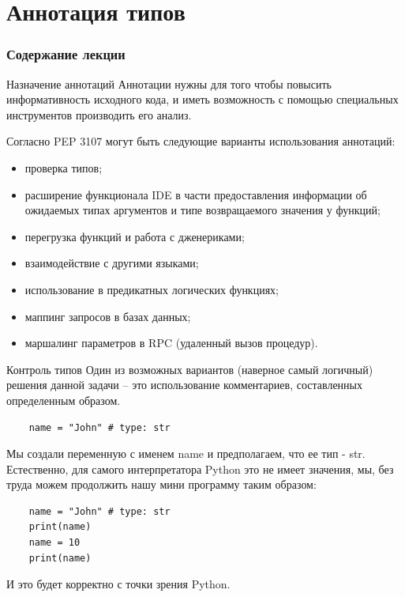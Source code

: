 \documentclass[xcolor=table]{beamer}
\begin{document}
\section{Аннотация типов}

\begin{frame}
  \frametitle{Содержание лекции}
  \tableofcontents[current]
\end{frame}

\begin{frame}[fragile]{Назначение аннотаций}
	Аннотации нужны для того чтобы повысить информативность исходного кода, и иметь возможность с помощью специальных инструментов производить его анализ. 

	\medskip
		
	Согласно PEP 3107 могут быть следующие варианты использования аннотаций:
	\begin{itemize}
		\item проверка типов;
		\item расширение функционала IDE в части предоставления информации об ожидаемых типах аргументов и типе возвращаемого значения у функций;
		\item перегрузка функций и работа с дженериками;
		\item взаимодействие с другими языками;
		\item использование в предикатных логических функциях;
		\item маппинг запросов в базах данных;
		\item маршалинг параметров в RPC (удаленный вызов процедур).
	\end{itemize}
\end{frame}

\begin{frame}[fragile]{Контроль типов}
	Один из возможных вариантов (наверное самый логичный) решения данной задачи -- это использование
комментариев, составленных определенным образом. 

	\begin{verbatim}
	name = "John" # type: str
	\end{verbatim}
	
	Мы создали переменную с именем name и предполагаем, что ее тип - str. Естественно, для самого интерпретатора Python это не имеет значения, мы, без труда можем продолжить нашу мини программу таким образом:
	\begin{verbatim}
	name = "John" # type: str
	print(name)
	name = 10
	print(name)	
	\end{verbatim}
	И это будет корректно с точки зрения Python.
\end{frame}
\end{document}
